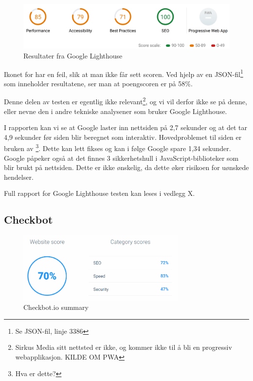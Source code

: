 \begin{figure}[H]
    \centering
    \includegraphics[width=\textwidth]{bjornar/Lighthouse-Report-mobile.png}
    \caption{Resultater fra Google Lighthouse}
    \label{fig:analysis-current-lightouse-summary}
\end{figure}

Ikonet for  har en feil, slik at man ikke får sett scoren. Ved hjelp av en JSON-fil\footnote{Se JSON-fil, linje 3386} som inneholder resultatene, ser man at poengscoren er på 58\%.

Denne delen av testen er egentlig ikke relevant\footnote{Sirkus Media sitt nettsted er ikke, og kommer ikke til å bli en progressiv webapplikasjon. KILDE OM PWA}, og vi vil derfor ikke se på denne, eller nevne den i andre tekniske analysener som bruker Google Lighthouse.

I rapporten kan vi se at Google laster inn nettsiden på 2,7 sekunder og at det tar 4,9 sekunder før siden blir beregnet som interaktiv. Hovedproblemet til siden er bruken av \footnote{Hva er dette?}. Dette kan lett fikses og kan i følge Google spare 1,34 sekunder. Google påpeker også at det finnes 3 sikkerhetshull i JavaScript-biblioteker som blir brukt på nettsiden. Dette er ikke ønskelig, da dette øker risikoen for uønskede hendelser.

Full rapport for Google Lighthouse testen kan leses i vedlegg X.

\subsection{Checkbot}
\begin{figure}[H]
    \centering
    \includegraphics[width=0.75\textwidth]{bjornar/checkbotio-summary.png}
    \caption{Checkbot.io summary}
    \label{fig:analysis-current-checkbot-summary}
\end{figure}


